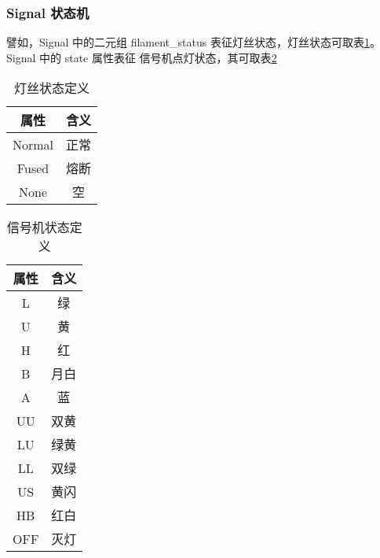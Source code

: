 \subsubsection{Signal 状态机}
譬如，Signal 中的二元组 filament\_status 表征灯丝状态，灯丝状态可取表\ref{fila_state}。
Signal 中的 state 属性表征 信号机点灯状态，其可取表\ref{sgn_state}
\begin{table}[htpb!]
    \centering
    \caption{\label{fila_state}灯丝状态定义}
    \begin{threeparttable}
        \begin{tabular}{cc}
            \toprule
            属性   & 含义 \\
            \midrule
            Normal & 正常 \\
            Fused  & 熔断 \\
            None   & 空   \\
            \bottomrule
        \end{tabular}
    \end{threeparttable}
\end{table}
\begin{table}[htpb!]
    \centering
    \caption{\label{sgn_state}信号机状态定义}
    \begin{threeparttable}
        \begin{tabular}{cc}
            \toprule
            属性 & 含义 \\
            \midrule
            L    & 绿   \\
            U    & 黄   \\
            H    & 红   \\
            B    & 月白 \\
            A    & 蓝   \\
            UU   & 双黄 \\
            LU   & 绿黄 \\
            LL   & 双绿 \\
            US   & 黄闪 \\
            HB   & 红白 \\
            OFF  & 灭灯 \\
            \bottomrule
        \end{tabular}
    \end{threeparttable}
\end{table}

